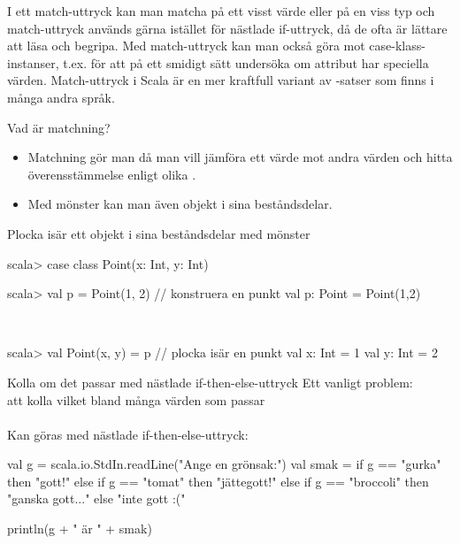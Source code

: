 


\ifkompendium
\noindent  I ett match-uttryck kan man matcha på ett visst värde eller på en viss typ och match-uttryck används gärna istället för nästlade if-uttryck, då de ofta är lättare att läsa och begripa. Med match-uttryck kan man också göra  mot case-klass-instanser, t.ex. för att på ett smidigt sätt undersöka om attribut har speciella värden. Match-uttryck i Scala är en mer kraftfull variant av -satser som finns i många andra språk.  
\fi

\begin{Slide}{Vad är matchning?}

  \begin{itemize}
    \item Matchning gör man då man vill jämföra ett värde mot andra värden och hitta överensstämmelse  enligt olika .
    \item Med mönster kan man även  objekt i sina beståndsdelar.
  \end{itemize}
\end{Slide}

\begin{Slide}{Plocka isär ett objekt i sina beståndsdelar med mönster}

\begin{REPLnonum}
scala> case class Point(x: Int, y: Int)

scala> val p = Point(1, 2)      // konstruera en punkt
val p: Point = Point(1,2)
\end{REPLnonum}

\pause 

~\\
\begin{REPLnonum}
scala> val Point(x, y) = p      // plocka isär en punkt
val x: Int = 1
val y: Int = 2
  
\end{REPLnonum}
\end{Slide}


\begin{Slide}{Kolla om det passar med nästlade if-then-else-uttryck}
Ett vanligt problem: \\ att kolla vilket bland många värden som passar \\~\\

Kan göras med nästlade if-then-else-uttryck:

\begin{Code}
val g = scala.io.StdIn.readLine("Ange en grönsak:")
val smak =
  if g == "gurka" then "gott!"
  else if g == "tomat" then "jättegott!"
  else if g == "broccoli" then "ganska gott..."
  else "inte gott :("

println(g + " är " + smak)
\end{Code}
      
\end{Slide}


